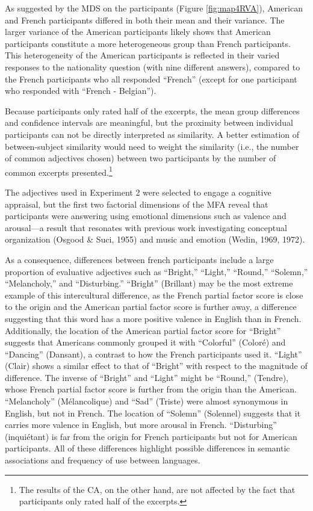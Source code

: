 \documentclass[
  english,
  man,floatsintext]{apa6}
\begin{document}
As suggested by the MDS on the participants (Figure \ref{fig:map4RVA}), American and French participants differed in both their mean and their variance. The larger variance of the American participants likely shows that American participants constitute a more heterogeneous group than French participants. This heterogeneity of the American participants is reflected in their varied responses to the nationality question (with nine different answers), compared to the French participants who all responded ``French'' (except for one participant who responded with ``French - Belgian'').

Because participants only rated half of the excerpts, the mean group differences and confidence intervals are meaningful, but the proximity between individual participants can not be directly interpreted as similarity. A better estimation of between-subject similarity would need to weight the similarity (i.e., the number of common adjectives chosen) between two participants by the number of common excerpts presented.\footnote{The results of the CA, on the other hand, are not affected by the fact that participants only rated half of the excerpts.}

The adjectives used in Experiment 2 were selected to engage a cognitive appraisal, but the first two factorial dimensions of the MFA reveal that participants were answering using emotional dimensions such as valence and arousal---a result that resonates with previous work investigating conceptual organization (Osgood \& Suci, 1955) and music and emotion (Wedin, 1969, 1972).

As a consequence, differences between french participants include a large proportion of evaluative adjectives such as ``Bright,'' ``Light,'' ``Round,'' ``Solemn,'' ``Melancholy,'' and ``Disturbing.'' ``Bright'' (Brillant) may be the most extreme example of this intercultural difference, as the French partial factor score is close to the origin and the American partial factor score is further away, a difference suggesting that this word has a more positive valence in English than in French. Additionally, the location of the American partial factor score for ``Bright'' suggests that Americans commonly grouped it with ``Colorful'' (Coloré) and ``Dancing'' (Dansant), a contrast to how the French participants used it. ``Light'' (Clair) shows a similar effect to that of ``Bright'' with respect to the magnitude of difference. The inverse of ``Bright'' and ``Light'' might be ``Round,'' (Tendre), whose French partial factor score is further from the origin than the American. ``Melancholy'' (Mélancolique) and ``Sad'' (Triste) were almost synonymous in English, but not in French. The location of ``Solemn'' (Solennel) suggests that it carries more valence in English, but more arousal in French. ``Disturbing'' (inquiétant) is far from the origin for French participants but not for American participants. All of these differences highlight possible differences in semantic associations and frequency of use between languages.
\end{document}
